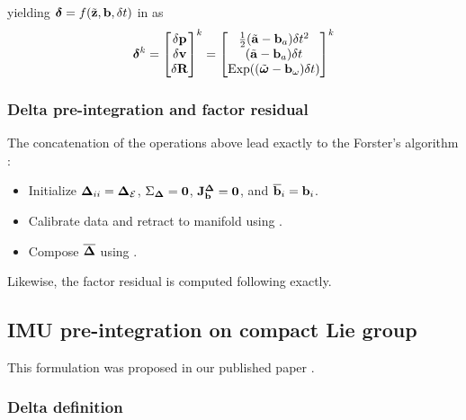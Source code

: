%
yielding $\bm\delta=f(\tilde{{\bf z}},{\bf b},\delta t)$ in  as
%
\begin{align}
    \bm\delta^k = \begin{bmatrix}
    \delta{\bf p}\\\delta{\bf v}\\\delta{\bf R}
    \end{bmatrix}^k =
    \begin{bmatrix}
    \tfrac12(\tilde{{\bf a}}-{\bf b}_a)\delta t^2 \\
    (\tilde{{\bf a}}-{\bf b}_a)\delta t \\
    \operatorname*{Exp}((\tilde{{\bm \omega}}-{\bf b}_\omega)\delta t)
    \end{bmatrix}^k
    \label{eq:delta_function_forster}
\end{align}
%

\subsubsection{Delta pre-integration and factor residual}

The concatenation of the operations above lead exactly to the Forster's algorithm \cite{forster2017-TRO}:
%
\begin{itemize}
    \item Initialize ${{\bm \Delta}}_{ii} = {{\bm \Delta}}_{\mathcal{E}}$, $\Sigma_{{\bm \Delta}}=\bf0$, ${\bf J}^{{\bm \Delta}}_{\bf b} = \bf0$, and $\overline{{\bf b}}_i = {\bf b}_i$.
    \item Calibrate data and retract to manifold using .
    \item Compose $\overline{{{\bm \Delta}}}$ using .
\end{itemize}
%
Likewise, the factor residual is computed following  exactly.



\subsection{IMU pre-integration on compact Lie group}
\label{sec:imu_preint_compact}

This formulation was proposed in our published paper \cite{fourmy2019absolute}.

\subsubsection{Delta definition}


